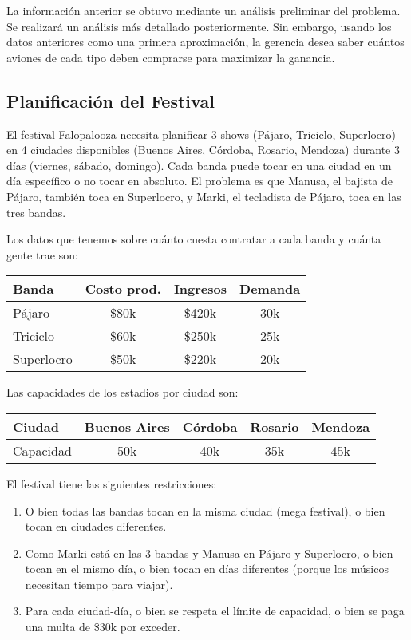 \documentclass[12pt]{article}
\begin{document}
\vspace{0.5em}

La información anterior se obtuvo mediante un análisis preliminar del problema. Se realizará un análisis más detallado posteriormente. Sin embargo, usando los datos anteriores como una primera aproximación, la gerencia desea saber cuántos aviones de cada tipo deben comprarse para maximizar la ganancia.

\subsection{Planificación del Festival}
El festival Falopalooza necesita planificar 3 shows (Pájaro, Triciclo, Superlocro) en 4 ciudades disponibles (Buenos Aires, Córdoba, Rosario, Mendoza) durante 3 días (viernes, sábado, domingo). Cada banda puede tocar en una ciudad en un día específico o no tocar en absoluto. El problema es que Manusa, el bajista de Pájaro, también toca en Superlocro, y Marki, el tecladista de Pájaro, toca en las tres bandas.

\vspace{0.5em}

Los datos que tenemos sobre cuánto cuesta contratar a cada banda y cuánta gente trae son:
\begin{table}[H]
\centering
\begin{tabular}{lccc}
\toprule
\textbf{Banda} & \textbf{Costo prod.} & \textbf{Ingresos} & \textbf{Demanda} \\
\midrule
Pájaro & \$80k & \$420k & 30k \\
Triciclo & \$60k & \$250k & 25k \\
Superlocro & \$50k & \$220k & 20k \\
\bottomrule
\end{tabular}
\end{table}

Las capacidades de los estadios por ciudad son:
\begin{table}[H]
\centering
\begin{tabular}{lcccc}
\toprule
\textbf{Ciudad} & \textbf{Buenos Aires} & \textbf{Córdoba} & \textbf{Rosario} & \textbf{Mendoza} \\
\midrule
Capacidad & 50k & 40k & 35k & 45k \\
\bottomrule
\end{tabular}
\end{table}

El festival tiene las siguientes restricciones:
\begin{enumerate}[label=\arabic*.]
    \item O bien todas las bandas tocan en la misma ciudad (mega festival), o bien tocan en ciudades diferentes.
    \item Como Marki está en las 3 bandas y Manusa en Pájaro y Superlocro, o bien tocan en el mismo día, o bien tocan en días diferentes (porque los músicos necesitan tiempo para viajar).
    \item Para cada ciudad-día, o bien se respeta el límite de capacidad, o bien se paga una multa de \$30k por exceder.
\end{enumerate}
\end{document}
